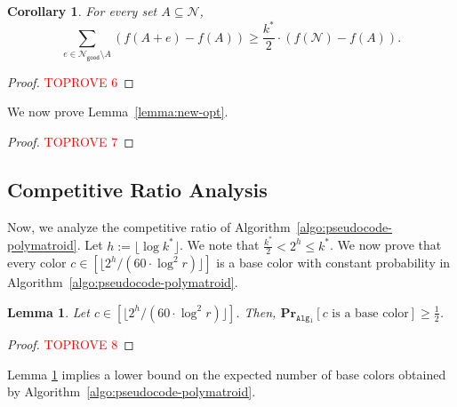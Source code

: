 \documentclass[11pt]{article}
\newtheorem{lemma}{Lemma}
\newtheorem{corollary}{Corollary}
\theoremstyle{definition}
\newcommand{\good}{\mathsf{good}}
\begin{document}
\begin{corollary}\label{corollary:new-ratio}
    For every set $A\subseteq \mathcal{N}$,
    $$\sum_{e\in \mathcal{N}_{\good}\setminus A} \left(f(A+e)-f(A)\right) \geq \frac{k^*}{2}\cdot \left(f(\mathcal{N})-f(A)\right).$$
\end{corollary}
\begin{proof}\textcolor{red}{TOPROVE 6}\end{proof}

\iffalse
Let $k^*_{\text{onl}}$ be the corresponding upper bound for the optimum with respect to good elements, i.e.,
\begin{equation}
    k^*_{\text{onl}}:=\min_{A\subseteq \mathcal{N}_{\good}: f(A)<f(\mathcal{N}_{\good})} \frac{\sum_{e\in \mathcal{N}_{\good}}f_A(e)}{f(\mathcal{N}_{\good})-f(A)}. \label{def:new-opt-k}
\end{equation}
The following corollary shows that $k^*_{\text{onl}}$ is at least half of $k^*$.

\begin{corollary}\label{corollary:new-opt}
    $k_{\text{onl}}^*\geq \frac{1}{2}k^*$.
\end{corollary}
\fi

We now prove Lemma~\ref{lemma:new-opt}.
\begin{proof}\textcolor{red}{TOPROVE 7}\end{proof}

\subsection{Competitive Ratio Analysis}\label{subsection:ratio-analysis}
Now, we analyze the competitive ratio of Algorithm~\ref{algo:pseudocode-polymatroid}. 
Let $h:=\lfloor \log k^* \rfloor$. We note that $\frac{k^*}{2}< 2^h \leq k^*$. We now prove that every color $c\in [\lfloor 2^h/ (60\cdot \log^2 r)\rfloor]$ is a base color with constant probability in Algorithm~\ref{algo:pseudocode-polymatroid}.

\begin{lemma}\label{lemma:polymatroid-proper-color-probability}
    Let $c \in [\lfloor 2^h/ (60\cdot \log^2 r)\rfloor]$. Then, $\mathbf{Pr}_{\texttt{Alg$_1$} }[c \text{ is a base color}]\geq \frac{1}{2}$.
\end{lemma}
\begin{proof}\textcolor{red}{TOPROVE 8}\end{proof}

Lemma \ref{lemma:polymatroid-proper-color-probability} implies a lower bound on the expected number of base colors obtained by Algorithm~\ref{algo:pseudocode-polymatroid}.
\end{document}
